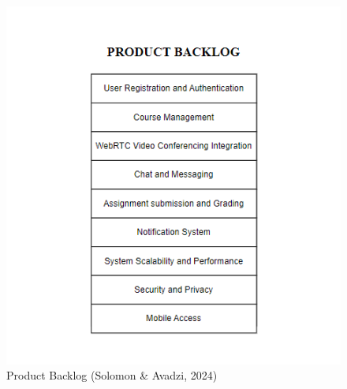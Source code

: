 \documentclass[a4paper,12pt]{article}  %
\begin{document}
\begin{figure}[H]
      \centering
      \includegraphics[width=1\textwidth]{figures/productbacklog.png}
      \caption{Product Backlog (Solomon \& Avadzi, 2024)}
\end{figure}
\end{document}
